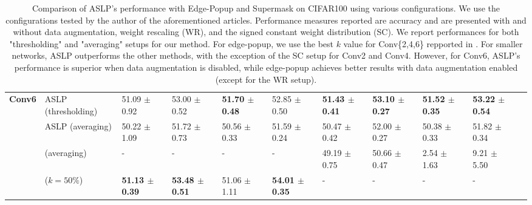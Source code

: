 \begin{table}
{\begin{tabular}{lllllllllll}
      \multirow{4}{*}{\textbf{Conv6}} & ASLP (thresholding) & 51.09 $\pm$ 0.92 & 53.00 $\pm$ 0.52 & \textbf{51.70 $\pm$ 0.48} & 52.85 $\pm$ 0.50 & \textbf{51.43 $\pm$ 0.41} & \textbf{53.10 $\pm$ 0.27} & \textbf{51.52 $\pm$ 0.35} & \textbf{53.22 $\pm$ 0.54} \\
      & ASLP (averaging) & 50.22 $\pm$ 1.09 & 51.72 $\pm$ 0.73 & 50.56 $\pm$ 0.33 & 51.59 $\pm$ 0.24 & 50.47 $\pm$ 0.42 & 52.00 $\pm$ 0.27 & 50.38 $\pm$ 0.33 & 51.82 $\pm$ 0.34 \\
      & \cite{DBLP:conf/nips/ZhouLLY19} (averaging) & - & - & - & - & 49.19 $\pm$ 0.75 & 50.66 $\pm$ 0.47 & 2.54 $\pm$ 1.63 & 9.21 $\pm$ 5.50 \\
      & \cite{DBLP:conf/cvpr/RamanujanWKFR20} ($k=50\%$) & \textbf{51.13 $\pm$ 0.39} & \textbf{53.48 $\pm$ 0.51} & 51.06 $\pm$ 1.11 & \textbf{54.01 $\pm$ 0.35} & - & - & - & - \\
      \bottomrule
    \end{tabular}
  } \caption{Comparison of ASLP's performance with Edge-Popup and Supermask
  \cite{DBLP:conf/cvpr/RamanujanWKFR20,DBLP:conf/nips/ZhouLLY19} on CIFAR100
  using various configurations. We use the configurations tested by the author
  of the aforementioned articles. Performance measures reported are accuracy and
  are presented with and without data augmentation, weight rescaling (WR), and
  the signed constant weight distribution (SC). We report performances for both
  "thresholding" and "averaging" setups for our method. For edge-popup, we use
  the best $k$ value for Conv\{2,4,6\} repported in
  \cite{DBLP:conf/cvpr/RamanujanWKFR20}. For smaller networks, ASLP outperforms
  the other methods, with the exception of the SC setup for Conv2 and Conv4.
  However, for Conv6, ASLP's performance is superior when data augmentation is
  disabled, while edge-popup achieves better results with data augmentation
  enabled (except for the WR setup).}
  \label{tab:chap2:con_performances_comparison_cifar100}
\end{table}


